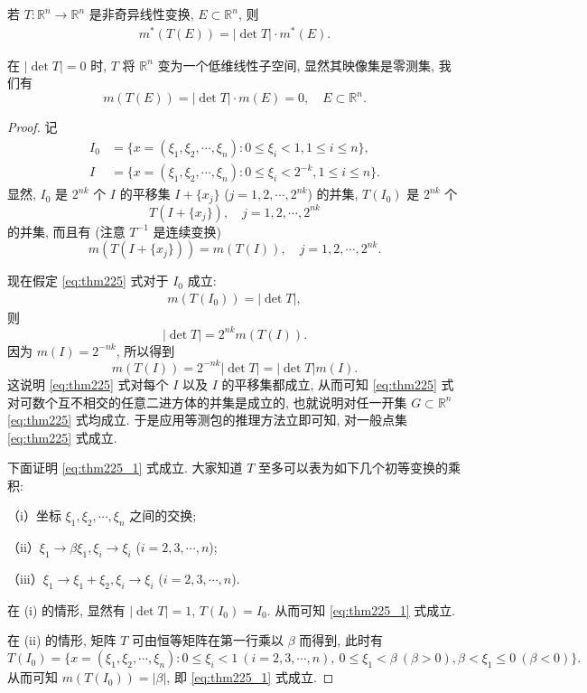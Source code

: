 \documentclass[../../main.tex]{subfiles}%
\begin{document}
\begin{theorem}\label{theorem:集合的线性变换的像的外测度}
若 $T:\mathbb{R}^n\to\mathbb{R}^n$ 是非奇异线性变换, $E\subset\mathbb{R}^n$, 则
\begin{align}
m^*(T(E)) = |\det T|\cdot m^*(E).\label{eq:thm225}
\end{align}
\end{theorem}
\begin{remark}
在 $|\det T| = 0$ 时, $T$ 将 $\mathbb{R}^n$ 变为一个低维线性子空间, 显然其映像集是零测集, 我们有
\[
m(T(E)) = |\det T|\cdot m(E) = 0,\quad E\subset\mathbb{R}^n.
\] 
\end{remark}
\begin{proof}
记
\begin{align*}
I_0 &= \{x = (\xi_1,\xi_2,\cdots,\xi_n): 0\leqslant\xi_i < 1, 1\leqslant i\leqslant n\},\\
I &= \{x = (\xi_1,\xi_2,\cdots,\xi_n): 0\leqslant\xi_i < 2^{-k}, 1\leqslant i\leqslant n\}.
\end{align*}
显然, $I_0$ 是 $2^{nk}$ 个 $I$ 的平移集 $I + \{x_j\}$ ($j = 1,2,\cdots,2^{nk}$) 的并集, $T(I_0)$ 是 $2^{nk}$ 个
\[
T(I + \{x_j\}),\quad j = 1,2,\cdots,2^{nk}
\]
的并集, 而且有 (注意 $T^{-1}$ 是连续变换)
\[
m(T(I + \{x_j\})) = m(T(I)),\quad j = 1,2,\cdots,2^{nk}.
\]

现在假定 \eqref{eq:thm225} 式对于 $I_0$ 成立:
\begin{align}
m(T(I_0)) = |\det T|,\label{eq:thm225_1}
\end{align}
则
\[
|\det T| = 2^{nk}m(T(I)).
\]
因为 $m(I)=2^{-nk}$, 所以得到
\[
m(T(I)) = 2^{-nk}|\det T| = |\det T|m(I).
\]
这说明 \eqref{eq:thm225} 式对每个 $I$ 以及 $I$ 的平移集都成立, 从而可知 \eqref{eq:thm225} 式对可数个互不相交的任意二进方体的并集是成立的, 也就说明对任一开集 $G\subset\mathbb{R}^n$ \eqref{eq:thm225} 式均成立. 于是应用等测包的推理方法立即可知, 对一般点集 \eqref{eq:thm225} 式成立.

下面证明 \eqref{eq:thm225_1} 式成立. 大家知道 $T$ 至多可以表为如下几个初等变换的乘积:

（i）坐标 $\xi_1,\xi_2,\cdots,\xi_n$ 之间的交换;

（ii）$\xi_1\to\beta\xi_1,\xi_i\to\xi_i$ ($i = 2,3,\cdots,n$);

（iii）$\xi_1\to\xi_1 + \xi_2,\xi_i\to\xi_i$ ($i = 2,3,\cdots,n$).

在 (i) 的情形, 显然有 $|\det T| = 1$, $T(I_0)=I_0$. 从而可知 \eqref{eq:thm225_1} 式成立.

在 (ii) 的情形, 矩阵 $T$ 可由恒等矩阵在第一行乘以 $\beta$ 而得到, 此时有
\[
T(I_0) = \{x = (\xi_1,\xi_2,\cdots,\xi_n): 0\leqslant\xi_i < 1\ (i = 2,3,\cdots,n),\ 0\leqslant\xi_1 < \beta\ (\beta > 0), \beta < \xi_1\leqslant 0\ (\beta < 0)\}.
\]
从而可知 $m(T(I_0)) = |\beta|$, 即 \eqref{eq:thm225_1} 式成立.


\end{proof}
\end{document}
